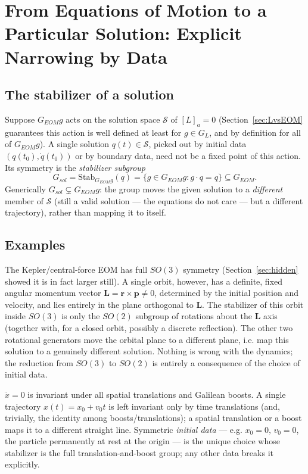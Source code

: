 \section{From Equations of Motion to a Particular Solution: Explicit Narrowing by Data}
\label{sec:explicit}

\subsection{The stabilizer of a solution}

Suppose $G_{EOM}g$ acts on the solution space $\mathcal S$ of $[L]_a=0$
(Section~\ref{sec:LvsEOM} guarantees this action is well defined at least for
$g\in G_L$, and by definition for all of $G_{EOM}g$). A single solution
$q(t)\in\mathcal S$, picked out by initial data $(q(t_0),\dot q(t_0))$ or by
boundary data, need not be a fixed point of this action. Its symmetry is the
\emph{stabilizer subgroup}
\[
    G_{sol}=\mathrm{Stab}_{G_{EOM}g}(q) = \{ g\in G_{EOM}g : g\cdot q = q \} \subseteq G_{EOM} .
\]
Generically $G_{sol} \subsetneq G_{EOM}g$: the group moves the given
solution to a \emph{different} member of $\mathcal S$ (still a valid solution —
the equations do not care — but a different trajectory), rather than mapping it
to itself.

\subsection{Examples}

\begin{example}
The Kepler/central-force EOM has full $SO(3)$ symmetry
    (Section~\ref{sec:hidden} showed it is in fact larger still). A single
    orbit, however, has a definite, fixed angular momentum vector $\bm L = \bm
    r\times\bm p\neq 0$, determined by the initial position and velocity, and
    lies entirely in the plane orthogonal to $\bm L$. The stabilizer of this
    orbit inside $SO(3)$ is only the $SO(2)$ subgroup of rotations about the
    $\bm L$ axis (together with, for a closed orbit, possibly a discrete
    reflection). The other two rotational generators move the orbital plane to
    a different plane, i.e. map this solution to a genuinely different
    solution. Nothing is wrong with the dynamics; the reduction from $SO(3)$ to
    $SO(2)$ is entirely a consequence of the choice of initial data.
\end{example}

\begin{example}
$\ddot x=0$ is invariant under all spatial translations and Galilean boosts. A
    single trajectory $x(t)=x_0+v_0t$ is left invariant only by time
    translations (and, trivially, the identity among boosts/translations); a
    spatial translation or a boost maps it to a different straight line.
    Symmetric \emph{initial data} — e.g. $x_0=0,\,v_0=0$, the particle
    permanently at rest at the origin — is the unique choice whose stabilizer
    is the full translation-and-boost group; any other data breaks it
    explicitly.
\end{example}

